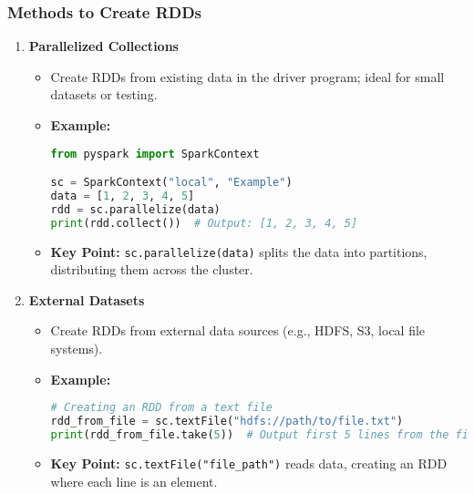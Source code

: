 \documentclass[aspectratio=169]{beamer}
\begin{document}
\begin{frame}[fragile]
    \frametitle{Methods to Create RDDs}
    \begin{enumerate}
        \item \textbf{Parallelized Collections}
        \begin{itemize}
            \item Create RDDs from existing data in the driver program; ideal for small datasets or testing.
            \item \textbf{Example:}
            \begin{lstlisting}[language=Python]
from pyspark import SparkContext

sc = SparkContext("local", "Example")
data = [1, 2, 3, 4, 5]
rdd = sc.parallelize(data)
print(rdd.collect())  # Output: [1, 2, 3, 4, 5]
            \end{lstlisting}
            \item \textbf{Key Point:} \texttt{sc.parallelize(data)} splits the data into partitions, distributing them across the cluster.
        \end{itemize}
        
        \item \textbf{External Datasets}
        \begin{itemize}
            \item Create RDDs from external data sources (e.g., HDFS, S3, local file systems).
            \item \textbf{Example:}
            \begin{lstlisting}[language=Python]
# Creating an RDD from a text file
rdd_from_file = sc.textFile("hdfs://path/to/file.txt")
print(rdd_from_file.take(5))  # Output first 5 lines from the file
            \end{lstlisting}
            \item \textbf{Key Point:} \texttt{sc.textFile("file\_path")} reads data, creating an RDD where each line is an element.
        \end{itemize}
    \end{enumerate}
\end{frame}
\end{document}
